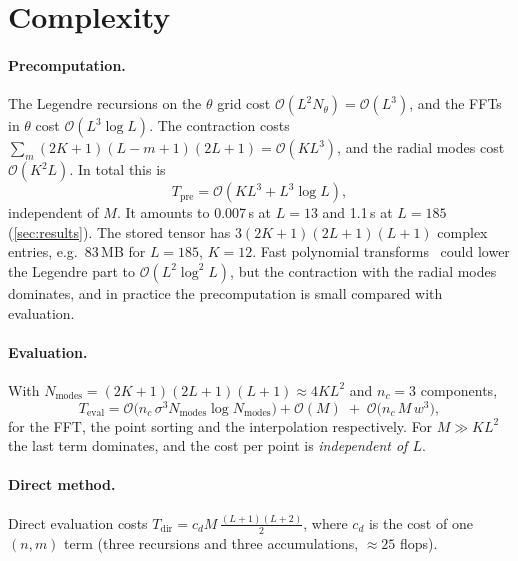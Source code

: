 \documentclass[11pt,a4paper]{article}
\theoremstyle{remark}
\newcommand{\Oh}{\mathcal{O}}
\begin{document}
\section{Complexity}\label{sec:complexity}

\paragraph{Precomputation.} The Legendre recursions on the $\theta$ grid cost $\Oh(L^2N_\theta)=\Oh(L^3)$,
and the FFTs in $\theta$ cost $\Oh(L^3\log L)$. The contraction costs
$\sum_m(2K+1)(L-m+1)(2L+1)=\Oh(KL^3)$, and the radial modes cost $\Oh(K^2L)$. In total this is
\begin{equation}
T_{\text{pre}}=\Oh(KL^3+L^3\log L),
\end{equation}
independent of $M$. It amounts to 0.007\,s at $L=13$ and 1.1\,s at $L=185$ (\cref{sec:results}). The stored
tensor has $3(2K+1)(2L+1)(L+1)$ complex entries, e.g.\ 83\,MB for $L=185$, $K=12$. Fast
polynomial transforms~\cite{kunis2003} could lower the Legendre part to
$\Oh(L^2\log^2L)$, but the contraction with the radial modes dominates, and in practice the
precomputation is small compared with evaluation.

\paragraph{Evaluation.} With $N_{\text{modes}}=(2K+1)(2L+1)(L+1)\approx4KL^2$ and $n_c=3$ components,
\begin{equation}
T_{\text{eval}}=\Oh\big(n_c\,\sigma^3N_{\text{modes}}\log N_{\text{modes}}\big)+\Oh(M)\;+\;\Oh\big(n_c\,M\,w^3\big),
\end{equation}
for the FFT, the point sorting and the interpolation respectively. For $M\gg KL^2$ the last
term dominates, and the cost per point is \emph{independent of $L$}.

\paragraph{Direct method.} Direct evaluation costs $T_{\text{dir}}=c_dM\,\frac{(L+1)(L+2)}2$, where $c_d$ is the
cost of one $(n,m)$ term (three recursions and three accumulations, $\approx 25$ flops).
\end{document}
